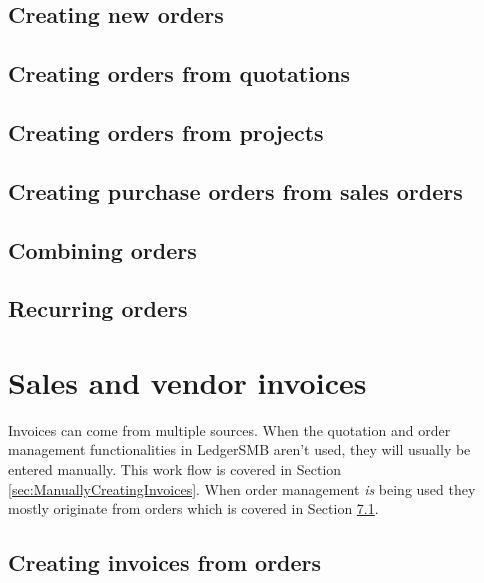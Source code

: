 \section{Creating new orders}

\section{Creating orders from quotations}

\section{Creating orders from projects}

\section{Creating purchase orders from sales orders}

\section{Combining orders}

\section{Recurring orders}
\label{sec:RecurringOrders}


\chapter{Sales and vendor invoices}

Invoices can come from multiple sources. When the quotation and order
management functionalities in LedgerSMB aren't used, they will usually
be entered manually. This work flow is covered in Section
\ref{sec:ManuallyCreatingInvoices}.
When order management \emph{is} being used they mostly originate from orders
which is covered in Section \ref{sec:InvoicesFromOrders}.



\section{Creating invoices from orders}
\label{sec:InvoicesFromOrders}



